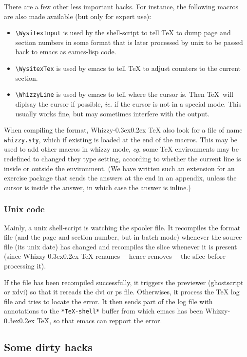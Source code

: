 \documentclass{article}
\let \lst \verb
\def \whizzy{{Whizzy\kern -0.3ex\raise 0.2ex \hbox{\TeX}}}
\begin{document}
There are a few other less important hacks. For instance, the following
macros are also made available (but only for expert use):
\begin {itemize}
\item
\lst"\WysitexInput" is used by the shell-script to tell {\TeX} to dump page
and section  numbers in some format that is later processed by unix to be
passed back to emacs as eamcs-lisp code.
\item
\lst"\WysitexTex" is used by emacs to tell {\TeX} to adjust counters to
the current section. 
\item
\lst"\WhizzyLine" is used by emacs to tell where the cursor is.
Then \TeX\ will diplsay the cursor if possible, {\em ie.} if the cursor is
not in a special mode. This usually works fine, but may sometimes interfere
with the output. 
\end {itemize}
When compiling the format, {\whizzy} also look for a file of name
\lst"whizzy.sty", which if existing is loaded at the end of the macros. 
This may be used to add other macros in {whizzy} mode, {\em eg.} 
some {\TeX} environments may be redefined to changed they type setting,
according to whether the current line is inside or outside the environment. 
(We have written such an extension for an exercise package that sends the
answers at the end in an appendix, unless the cursor is inside the answer,
in which case the answer is inline.)

\subsubsection* {Unix code}

Mainly, a unix shell-script is watching the spooler file.  It recompiles the
format file (and the page and section number, but in batch mode) whenever
the source file (its unix date) has changed  and 
recompiles the slice whenever it is present (since {\whizzy} renames ---hence
removes--- the slice before processing it).

If the file has been recompiled successfully, it triggers the previewer
(ghostscript or xdvi) so that it rereads the dvi or ps file. Otherwises, it
process the {\TeX} log file and tries to locate the error. It then sends part
of the log file with annotations to the \lst"*TeX-shell*" buffer from which
emacs has been {\whizzy}, so that emacs can repport the error. 


\subsection{Some dirty hacks}
\end{document}
